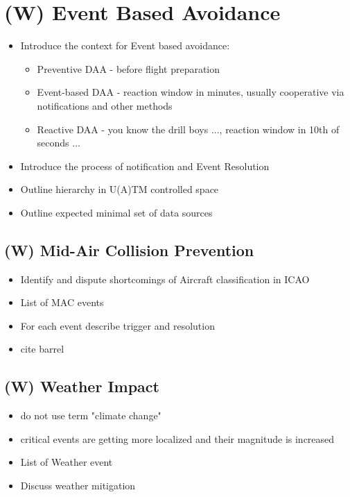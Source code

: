 \section{(W) Event Based Avoidance}\label{sec:EventBasedAvoidance}
\begin{itemize}
    \item Introduce the context for Event based avoidance: 
    \begin{itemize}
        \item Preventive DAA - before flight preparation
        \item Event-based DAA - reaction window in minutes, usually cooperative via notifications and other methods
        \item Reactive DAA - you know the drill boys ..., reaction window in 10th of seconds ...
    \end{itemize}
    \item Introduce the process of notification and Event Resolution
    \item Outline hierarchy in U(A)TM controlled space 
    \item Outline expected minimal set of data sources
\end{itemize}

\subsection{(W) Mid-Air Collision Prevention}\label{sec:MidairCollisionPrevention}
\begin{itemize}
    \item Identify and dispute shortcomings of Aircraft classification in ICAO
    \item List of MAC events
    \item For each event describe trigger and resolution 
    \item cite barrel \cite{welzl1991smallest}
\end{itemize}

\subsection{(W) Weather Impact}\label{sec:WeatherImpact}

    \begin{itemize}
        \item do not use term "climate change"
        \item critical events are getting more localized and their magnitude is increased
        \item List of Weather event
        \item Discuss weather mitigation
    \end{itemize}
    
